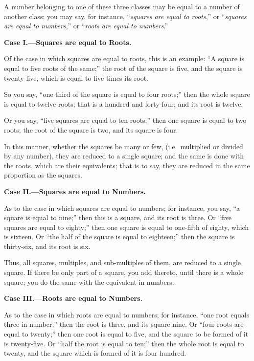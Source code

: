 A number belonging to one of these three classes may be equal to a number of another class; you may say, for instance, ``\textit{squares are equal to roots},'' or ``\textit{squares are equal to numbers},'' or ``\textit{roots are equal to numbers}.''

\vspace{0.5cm}
\noindent\textbf{Case I.---Squares are equal to Roots.}

Of the case in which squares are equal to roots, this is an example: ``A square is equal to five roots of the same;'' the root of the square is five, and the square is twenty-five, which is equal to five times its root.

So you say, ``one third of the square is equal to four roots;'' then the whole square is equal to twelve roots; that is a hundred and forty-four; and its root is twelve.

Or you say, ``five squares are equal to ten roots;'' then one square is equal to two roots; the root of the square is two, and its square is four.

In this manner, whether the squares be many or few, (i.e.~multiplied or divided by any number), they are reduced to a single square; and the same is done with the roots, which are their equivalents; that is to say, they are reduced in the same proportion as the squares.

\vspace{0.3cm}
\noindent\textbf{Case II.---Squares are equal to Numbers.}

As to the case in which squares are equal to numbers; for instance, you say, ``a square is equal to nine;'' then this is a square, and its root is three. Or ``five squares are equal to eighty;'' then one square is equal to one-fifth of eighty, which is sixteen. Or ``the half of the square is equal to eighteen;'' then the square is thirty-six, and its root is six.

Thus, all squares, multiples, and sub-multiples of them, are reduced to a single square. If there be only part of a square, you add thereto, until there is a whole square; you do the same with the equivalent in numbers.

\vspace{0.3cm}
\noindent\textbf{Case III.---Roots are equal to Numbers.}

As to the case in which roots are equal to numbers; for instance, ``one root equals three in number;'' then the root is three, and its square nine. Or ``four roots are equal to twenty;'' then one root is equal to five, and the square to be formed of it is twenty-five. Or ``half the root is equal to ten;'' then the whole root is equal to twenty, and the square which is formed of it is four hundred.

